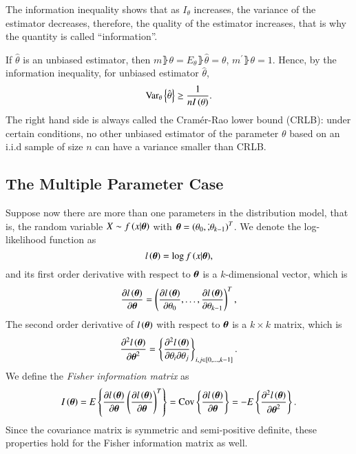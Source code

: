 The information inequality shows that as $I_{\theta}$ increases, the variance of the estimator decreases, therefore, the quality of the estimator increases, that is why the quantity is called “information”.
\par
If $\hat{\theta}$ is an unbiased estimator, then $m\rBrace{\theta}=E_{\theta}\rBrace{\hat{\theta}}=\theta$, $m^{\prime}\rBrace{\theta}=1$.
Hence, by the information inequality, for unbiased estimator $\hat{\theta}$,
\begin{equation*}
    \text{Var}_{\theta}\left\{{\hat{\theta}}\right\}\geq\frac{1}{nI\left({\theta}\right)}.
\end{equation*}
The right hand side is always called the Cram\'er-Rao lower bound (CRLB): under certain conditions, no other unbiased estimator of the parameter $\theta$ based on an i.i.d sample of size $n$ can have a variance smaller than CRLB.
\subsection{The Multiple Parameter Case}
Suppose now there are more than one parameters in the distribution model, that is, the random variable $X\sim{}f\left({x|\boldsymbol{\theta}}\right)$ with $\boldsymbol{\theta}=\left({\theta_{0},\dot,\theta_{k-1}}\right)^{T}$.
We denote the log-likelihood function as
\begin{equation*}
    l\left({\boldsymbol{\theta}}\right)=\log{f\left({x|\boldsymbol{\theta}}\right)},
\end{equation*}
and its first order derivative with respect to $\boldsymbol{\theta}$ is a $k$-dimensional vector, which is
\begin{equation*}
    \frac{\partial{}l\left({\boldsymbol{\theta}}\right)}{\partial{}\boldsymbol{\theta}}=\left({\frac{\partial{}l\left({\boldsymbol{\theta}}\right)}{\partial{}\theta_{0}},\dots,\frac{\partial{}l\left({\boldsymbol{\theta}}\right)}{\partial{}\theta_{k-1}}}\right)^{T},
\end{equation*}
The second order derivative of $l\left({\boldsymbol{\theta}}\right)$ with respect to $\boldsymbol{\theta}$ is a $k\times{}k$ matrix, which is
\begin{equation*}
    \frac{\partial^{2}l\left({\boldsymbol{\theta}}\right)}{\partial{}\boldsymbol{\theta}^{2}}=\left\{{\frac{\partial^{2}l\left({\boldsymbol{\theta}}\right)}{\partial{}\theta_{i}\partial{}\theta_{j}}}\right\}_{i,j\in\left[{0,\dots,k-1}\right]}.
\end{equation*}
We define the \emph{Fisher information matrix} as
\begin{equation*}
    I\left({\boldsymbol{\theta}}\right)=E\left\{{\frac{\partial{}l\left({\boldsymbol{\theta}}\right)}{\partial\boldsymbol{\theta}}\left({\frac{\partial{}l\left({\boldsymbol{\theta}}\right)}{\partial\boldsymbol{\theta}}}\right)^{T}}\right\}=\text{Cov}\left\{{\frac{\partial{}l\left({\boldsymbol{\theta}}\right)}{\partial\boldsymbol{\theta}}}\right\}=-E\left\{{\frac{\partial^{2}l\left({\boldsymbol{\theta}}\right)}{\partial{}\boldsymbol{\theta}^{2}}}\right\}.
\end{equation*}
Since the covariance matrix is symmetric and semi-positive definite, these properties hold for the Fisher information matrix as well.
